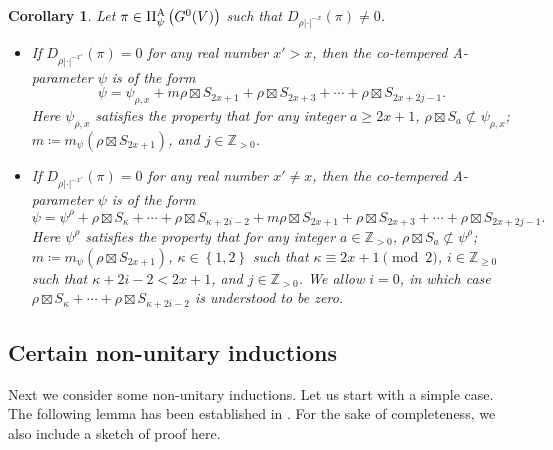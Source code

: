 \documentclass[11pt,letterpaper]{amsart}
\theoremstyle{plain}
\newcounter{theorem}[section]
\numberwithin{theorem}{section}
\numberwithin{equation}{subsection}
\newtheorem{Cor}[theorem]{Corollary}
\theoremstyle{remark}
\newcommand{\Z}{\mathbb{Z}}
\def\AP{\Pi^{\rm A}} %
\begin{document}
\begin{Cor}\label{C:co-temperedShapeofAPara}
Let $\pi\in\AP_\psi\left(G^0(V)\right)$ such that $D_{\rho|\cdot|^{-x}}\left(\pi\right)\neq 0$. 
\begin{itemize}
       \item If $D_{\rho|\cdot|^{-x'}}\left(\pi\right)=0$ for any real number $x'>x$, then the co-tempered A-parameter $\psi$ is of the form
       \[
            \psi = \psi_{\rho,x} + m\rho \boxtimes S_{2x+1} + \rho\boxtimes S_{2x+3} + \cdots + \rho\boxtimes S_{2x+2j-1}.
       \]
       Here $\psi_{\rho,x}$ satisfies the property that for any integer $a\geq 2x+1$, $\rho\boxtimes S_a\not\subset \psi_{\rho,x}$; $m\coloneqq m_\psi\left(\rho\boxtimes S_{2x+1}\right)$, and $j\in\Z_{> 0}$.  

       \vskip 5pt

       \item If $D_{\rho|\cdot|^{-x'}}\left(\pi\right)=0$ for any real number $x'\neq x$, then the co-tempered A-parameter $\psi$ is of the form
       \[
            \psi = \psi^{\rho} + \rho\boxtimes S_{\kappa} + \cdots + \rho\boxtimes S_{\kappa + 2i-2} + m\rho\boxtimes S_{2x+1} + \rho\boxtimes S_{2x+3} + \cdots + \rho\boxtimes S_{2x+2j-1}.
       \]
       Here $\psi^{\rho}$ satisfies the property that for any integer $a\in\Z_{>0}$, $\rho\boxtimes S_a\not\subset \psi^{\rho}$; $m\coloneqq m_\psi\left(\rho\boxtimes S_{2x+1}\right)$, $\kappa\in\left\{1,2\right\}$ such that $\kappa\equiv 2x+1\pmod 2$, $i\in\Z_{\geq 0}$ such that $\kappa+2i-2<2x+1$, and $j\in\Z_{> 0}$. We allow $i=0$, in which case $\rho\boxtimes S_{\kappa} + \cdots + \rho\boxtimes S_{\kappa + 2i-2}$ is understood to be zero.
    \end{itemize}   
\end{Cor}

\vskip 5pt


\subsection{Certain non-unitary inductions} %
\label{sub:certain_non_unitary_inductions}

Next we consider some non-unitary inductions. Let us start with a simple case. The following lemma has been established in \cite{clw26}. For the sake of completeness, we also include a sketch of proof here.
\end{document}
